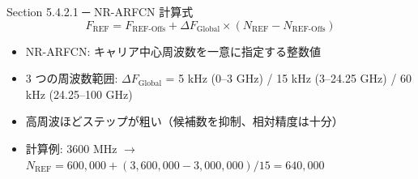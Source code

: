 \begin{frame}{Section 5.4.2.1 ─ NR-ARFCN 計算式}
\begin{equation*}
F_{\mathrm{REF}} = F_{\mathrm{REF\text{-}Offs}} + \Delta F_{\mathrm{Global}} \times (N_{\mathrm{REF}} - N_{\mathrm{REF\text{-}Offs}})
\end{equation*}

\begin{itemize}
  \item NR-ARFCN: キャリア中心周波数を一意に指定する整数値
  \item 3 つの周波数範囲: $\Delta F_{\mathrm{Global}}$ = 5 kHz (0--3 GHz) / 15 kHz (3--24.25 GHz) / 60 kHz (24.25--100 GHz)
  \item 高周波ほどステップが粗い（候補数を抑制、相対精度は十分）
  \item 計算例: 3600 MHz $\to$ $N_{\mathrm{REF}} = 600{,}000 + (3{,}600{,}000 - 3{,}000{,}000)/15 = 640{,}000$
\end{itemize}
\end{frame}
